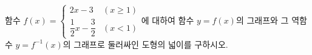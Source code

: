 함수 $f(x)=\begin{cases} 2x-3 & (x\ge 1) \\[1ex] \dfrac{1}{2}x-\dfrac{3}{2} & (x<1) \end{cases}$에 대하여 함수 $y=f(x)$의 그래프와 그 역함수 $y=f^{-1}(x)$의 그래프로 둘러싸인 도형의 넓이를 구하시오.
